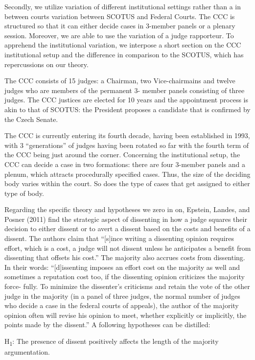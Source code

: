 \documentclass[
  11pt,
]{article}
\begin{document}
Secondly, we utilize variation of different institutional settings
rather than a in between courts variation between SCOTUS and Federal
Courts. The CCC is structured so that it can either decide cases in
3-member panels or a plenary session. Moreover, we are able to use the
variation of a judge rapporteur. To apprehend the institutional
variation, we interpose a short section on the CCC institutional setup
and the difference in comparison to the SCOTUS, which has repercussions
on our theory.

The CCC consists of 15 judges: a Chairman, two Vice-chairmains and
twelve judges who are members of the permanent 3- member panels
consisting of three judges. The CCC justices are elected for 10 years
and the appointment process is akin to that of SCOTUS: the President
proposes a candidate that is confirmed by the Czech Senate.

The CCC is currently entering its fourth decade, having been established
in 1993, with 3 ``generations'' of judges having been rotated so far
with the fourth term of the CCC being just around the corner. Concerning
the institutional setup, the CCC can decide a case in two formations:
there are four 3-member panels and a plenum, which attracts procedurally
specified cases. Thus, the size of the deciding body varies within the
court. So does the type of cases that get assigned to either type of
body.

Regarding the specific theory and hypotheses we zero in on, Epstein,
Landes, and Posner (2011) find the strategic aspect of dissenting in how
a judge squares their decision to either dissent or to avert a dissent
based on the costs and benefits of a dissent. The authors claim that
``{[}s{]}ince writing a dissenting opinion requires effort, which is a
cost, a judge will not dissent unless he anticipates a benefit from
dissenting that offsets his cost.'' The majority also accrues costs from
dissenting. In their words: ``{[}d{]}issenting imposes an effort cost on
the majority as well and sometimes a reputation cost too, if the
dissenting opinion criticizes the majority force- fully. To minimize the
dissenter's criticisms and retain the vote of the other judge in the
majority (in a panel of three judges, the normal number of judges who
decide a case in the federal courts of appeals), the author of the
majority opinion often will revise his opinion to meet, whether
explicitly or implicitly, the points made by the dissent.'' A following
hypotheses can be distilled:

H\textsubscript{1}: The presence of dissent positively affects the
length of the majority argumentation.
\end{document}
